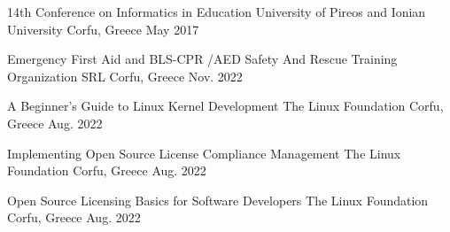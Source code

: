 \begin{cventries}
  \cventry
    {14th Conference on Informatics in Education} %
    {University of Pireos and Ionian University} %
    {Corfu, Greece} %
    {May 2017} %
    {
      \begin{cvitems} %
      \end{cvitems}
    }


  \cventry
    {Emergency First Aid and BLS-CPR /AED} %
    {Safety And Rescue Training Organization SRL} %
    {Corfu, Greece} %
    {Nov. 2022} %
    {
      \begin{cvitems} %
      \end{cvitems}
    }


  \cventry
    {A Beginner's Guide to Linux Kernel Development} %
    {The Linux Foundation} %
    {Corfu, Greece} %
    {Aug. 2022} %
    {
      \begin{cvitems} %
      \end{cvitems}
    }


  \cventry
    {Implementing Open Source License Compliance Management} %
    {The Linux Foundation} %
    {Corfu, Greece} %
    {Aug. 2022} %
    {
      \begin{cvitems} %
      \end{cvitems}
    }


  \cventry
    {Open Source Licensing Basics for Software Developers} %
    {The Linux Foundation} %
    {Corfu, Greece} %
    {Aug. 2022} %
    {
      \begin{cvitems} %
      \end{cvitems}
    }


\end{cventries}
